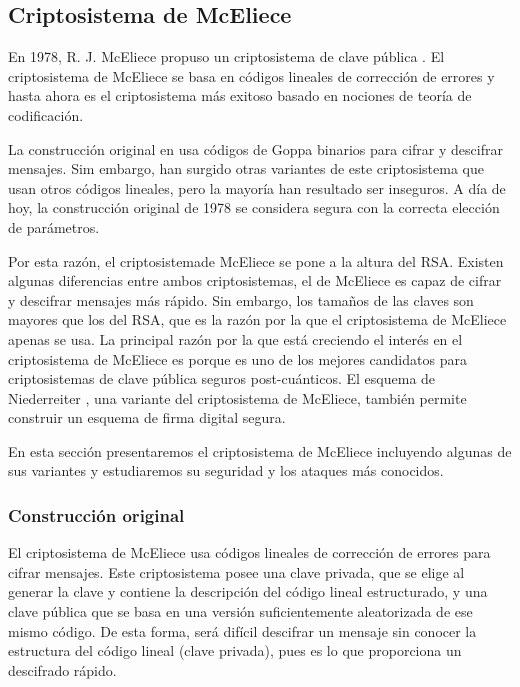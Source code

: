 \subsection{Criptosistema de McEliece}

En 1978, R. J. McEliece propuso un criptosistema de clave pública \cite{McEliece_1978}. El criptosistema de McEliece se basa en códigos lineales de corrección de errores y hasta ahora es el criptosistema más exitoso basado en nociones de teoría de codificación.

La construcción original en \cite{McEliece_1978} usa códigos de Goppa binarios para cifrar y descifrar mensajes. Sim embargo, han surgido otras variantes de este criptosistema que usan otros códigos lineales, pero la mayoría han resultado ser inseguros. A día de hoy, la construcción original de 1978 se considera segura con la correcta elección de parámetros.

Por esta razón, el criptosistemade McEliece se pone a la altura del RSA. Existen algunas diferencias entre ambos criptosistemas, el de McEliece es capaz de cifrar y descifrar mensajes más rápido. Sin embargo, los tamaños de las claves son mayores que los del RSA, que es la razón por la que el criptosistema de McEliece apenas se usa. La principal razón por la que está creciendo el interés en el criptosistema de McEliece es porque es uno de los mejores candidatos para criptosistemas de clave pública seguros post-cuánticos. El esquema de Niederreiter \cite{Niederreiter_1986}, una variante del criptosistema de McEliece, también permite construir un esquema de firma digital segura.

En esta sección presentaremos el criptosistema de McEliece incluyendo algunas de sus variantes y estudiaremos su seguridad y los ataques más conocidos.

\subsubsection{Construcción original}

El criptosistema de McEliece usa códigos lineales de corrección de errores para cifrar mensajes. Este criptosistema posee una clave privada, que se elige al generar la clave y contiene la descripción del código lineal estructurado, y una clave pública que se basa en una versión suficientemente aleatorizada de ese mismo código. De esta forma, será difícil descifrar un mensaje sin conocer la estructura del código lineal (clave privada), pues es lo que proporciona un descifrado rápido.

